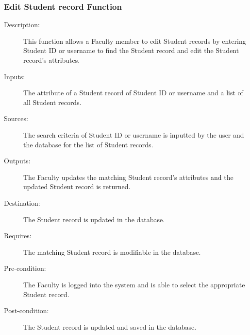 \subsubsection{\large Edit Student record Function} 
\begin{boxed} %
\small\begin{description}
\item[Description:]
   This function allows a Faculty member to edit Student records by entering
   Student ID or username to find the Student record and edit the Student
   record's attributes.
\item[Inputs:]
   The attribute of a Student record of Student ID or username and a list of all
   Student records.
\item[Sources:]
   The search criteria of Student ID or username is inputted by the user and the
   database for the list of Student records.
\item[Outputs:]
   The Faculty updates the matching Student record's attributes and the updated
   Student record is returned.
\item[Destination:]
   The Student record is updated in the database.
\item[Requires:]
   The matching Student record is modifiable in the database.
\item[Pre-condition:]
   The Faculty is logged into the system and is able to select the appropriate
   Student record.
\item[Post-condition:]
   The Student record is updated and saved in the database.
\end{description}
\normalsize
\end{boxed} %

